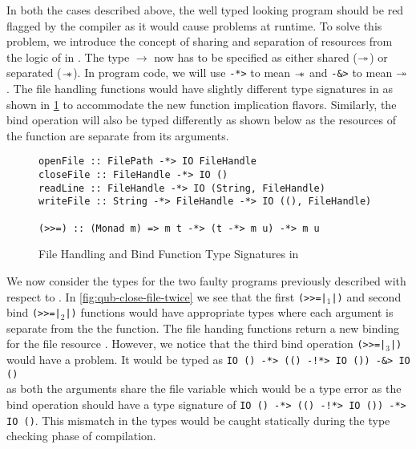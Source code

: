 In both the cases described above, the well typed looking program should be red flagged by the compiler as it would
cause problems at runtime. To solve this problem, we introduce the %
concept of sharing and separation of resources from the logic of \BI{} in \qub. The type $\rightarrow$ now
has to be specified as either shared ($\twoheadrightarrow$) or separated ($\mathrel{-\mkern-6mu*}$). In \qub{} program code, we will use
\texttt{-*>} to mean $\mathrel{-\mkern-6mu*}$ and \texttt{-&>} to mean $\twoheadrightarrow$.
The file handling functions would have slightly different type signatures in \qub{} as shown in \cref{fig:qub-file-handling-functions} to accommodate
the new function implication flavors. Similarly, the bind operation will also be typed differently as shown below as the resources of the function are
separate from its arguments. %

\begin{figure}[h]
  \begin{framed}
    \begin{verbatim}
openFile :: FilePath -*> IO FileHandle
closeFile :: FileHandle -*> IO ()
readLine :: FileHandle -*> IO (String, FileHandle)
writeFile :: String -*> FileHandle -*> IO ((), FileHandle)

(>>=) :: (Monad m) => m t -*> (t -*> m u) -*> m u
    \end{verbatim}
  \end{framed}
  \caption{File Handling and Bind Function Type Signatures in \qub{}}
  \label{fig:qub-file-handling-functions}
\end{figure}

We now consider the types for the two faulty programs previously described with respect to \qub{}.
In \cref{fig:qub-close-file-twice} we see that the first \texttt{(>>=|$_1$|)}
and second bind \texttt{(>>=|$_2$|)} functions would have appropriate types
where each argument is separate from the the function. The file handing functions
return a new binding for the file resource . However, we notice that the third bind operation
\texttt{(>>=|$_3$|)} would have a problem. It  would be typed as
\texttt{IO () -*> (() -!*> IO ()) -&> IO ()}\\
as both the arguments share the file variable  which would be a type error
as the bind operation should have a type signature of \texttt{IO () -*> (() -!*> IO ()) -*> IO ()}.
This mismatch in the types would be caught statically during the type checking phase of compilation.

